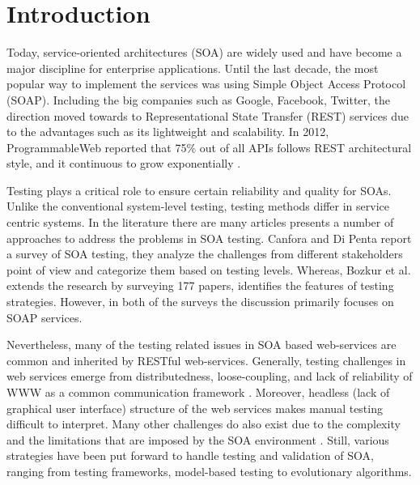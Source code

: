 \documentclass[english]{tktltiki}
\begin{document}
\section{Introduction}
Today, service-oriented architectures (SOA) are widely used and have become a major discipline for enterprise applications. Until the last decade, the most popular way to implement the services was using Simple Object Access Protocol (SOAP). Including the big companies such as Google, Facebook, Twitter, the direction moved towards to Representational State Transfer (REST) services due to the advantages such as its lightweight and scalability. In 2012, ProgrammableWeb reported that 75\% out of all APIs follows REST architectural style, and it continuous to grow exponentially \cite{programmableweb}.

Testing plays a critical role to ensure certain reliability and quality for SOAs. Unlike the conventional system-level testing, testing methods differ in service centric systems. In the literature there are many articles presents a number of approaches to address the problems in SOA testing. Canfora and Di Penta \cite{canfora2009service} report a survey of SOA testing, they analyze the challenges from different stakeholders point of view and categorize them based on testing levels. Whereas, Bozkur et al. \cite{bozkurt2013testing} extends the research by surveying 177 papers, identifies the features of testing strategies. However, in both of the surveys the discussion primarily focuses on SOAP services.

Nevertheless, many of the testing related issues in SOA based web-services are common and inherited by RESTful web-services. Generally, testing challenges in web services emerge from distributedness, loose-coupling, and lack of reliability of WWW as a common communication framework \cite{chakrabarti2009test}. Moreover, headless (lack of graphical user interface) structure of the web services makes manual testing difficult to interpret. Many other challenges do also exist due to the complexity and the limitations that are imposed by the SOA environment \cite{canfora2006testing, canfora2009service, bozkurt2013testing}. Still, various strategies have been put forward to handle testing and validation of SOA, ranging from testing frameworks, model-based testing to evolutionary algorithms.
\end{document}
